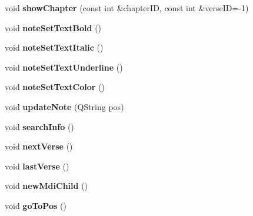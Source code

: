 \begin{CompactItemize}
\item 
\hypertarget{classMainWindow_185af1206f305a0360ae90ee07f1238b}{
void \textbf{showChapter} (const int \&chapterID, const int \&verseID=-1)}
\label{classMainWindow_185af1206f305a0360ae90ee07f1238b}

\item 
\hypertarget{classMainWindow_a4e6957f092e71773e99cedc81871edd}{
void \textbf{noteSetTextBold} ()}
\label{classMainWindow_a4e6957f092e71773e99cedc81871edd}

\item 
\hypertarget{classMainWindow_f6912747b78ec72baa60106803a8bd55}{
void \textbf{noteSetTextItalic} ()}
\label{classMainWindow_f6912747b78ec72baa60106803a8bd55}

\item 
\hypertarget{classMainWindow_eb67a02b4fe2547daf26a989eabca0ed}{
void \textbf{noteSetTextUnderline} ()}
\label{classMainWindow_eb67a02b4fe2547daf26a989eabca0ed}

\item 
\hypertarget{classMainWindow_fcb7b92eaa37847264dfe5f9e72b5eda}{
void \textbf{noteSetTextColor} ()}
\label{classMainWindow_fcb7b92eaa37847264dfe5f9e72b5eda}

\item 
\hypertarget{classMainWindow_a28779d18104827a149cef3bf2bcda39}{
void \textbf{updateNote} (QString pos)}
\label{classMainWindow_a28779d18104827a149cef3bf2bcda39}

\item 
\hypertarget{classMainWindow_4de8af130586b3d86dfd51969629bb48}{
void \textbf{searchInfo} ()}
\label{classMainWindow_4de8af130586b3d86dfd51969629bb48}

\item 
\hypertarget{classMainWindow_f3f4bb25c9222bf013335dd04861c321}{
void \textbf{nextVerse} ()}
\label{classMainWindow_f3f4bb25c9222bf013335dd04861c321}

\item 
\hypertarget{classMainWindow_3f2c62264b6411d44710ecbda755d8c0}{
void \textbf{lastVerse} ()}
\label{classMainWindow_3f2c62264b6411d44710ecbda755d8c0}

\item 
\hypertarget{classMainWindow_c548d9ca9a6d5ddc1dc2f80d95241d89}{
void \textbf{newMdiChild} ()}
\label{classMainWindow_c548d9ca9a6d5ddc1dc2f80d95241d89}

\item 
\hypertarget{classMainWindow_12f89a399fe8115dc4423219d7f7c2ed}{
void \textbf{goToPos} ()}
\label{classMainWindow_12f89a399fe8115dc4423219d7f7c2ed}


\end{CompactItemize}

